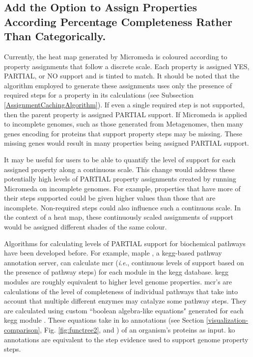 \subsection{Add the Option to Assign Properties According Percentage 
Completeness Rather Than Categorically.}

Currently, the heat map generated by Micromeda is coloured according to property 
assignments that follow a discrete scale. Each property is assigned YES, 
PARTIAL, or NO support and is tinted to match. It should be noted that the 
algorithm employed to generate these assignments uses only the presence of 
required steps for a property in its calculations (see Subsection 
\ref{AssignmentCachingAlgorithm}). If even a single required step is not 
supported, then the parent property is assigned PARTIAL support. If Micromeda is 
applied to incomplete genomes, such as those generated from Metagenomes, then 
many genes encoding for proteins that support property steps may be missing. 
These missing genes would result in many properties being assigned PARTIAL 
support. 

It may be useful for users to be able to quantify the level of support for each 
assigned property along a continuous scale. This change would address these 
potentially high levels of PARTIAL property assignments created by running 
Micromeda on incomplete genomes. For example, properties that have more of their 
steps supported could be given higher values than those that are incomplete. 
Non-required steps could also influence such a continuous scale. In the context 
of a heat map, these continuously scaled assignments of support would be 
assigned different shades of the same colour.

Algorithms for calculating levels of PARTIAL support for biochemical pathways 
have been developed before. For example, \gls{maple} \cite{takami2016automated}, 
a \gls{kegg}-based pathway annotation server, can calculate \gls{mcr} (\textit{i}.\textit{e}., 
continuous levels of support based on the presence of pathway steps) for each 
module in the \gls{kegg}  database. \gls{kegg} modules are roughly equivalent to 
higher level genome properties. \gls{mcr}'s are calculations of the level of 
completeness of individual pathways that take into account that multiple 
different enzymes may catalyze some pathway steps. They are calculated using 
custom ``boolean algebra-like equations" generated for each \gls{kegg} module 
\cite{takami2012evaluation}. These equations take in \gls{ko} annotations (see 
Section \ref{visualization-comparison}, Fig. \ref{fig:functree2}, and 
\cite{mao2005automated}) of an organism's proteins as input. \gls{ko} 
annotations are equivalent to the step evidence used to support genome property 
steps. 

